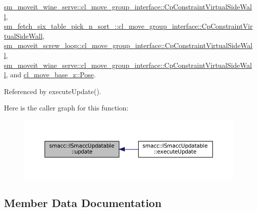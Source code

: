 \hyperlink{classsm__moveit__wine__serve_1_1cl__move__group__interface_1_1CpConstraintVirtualSideWall_a455681238d7baaaa5aa0f1e625864f3a}{sm\+\_\+moveit\+\_\+wine\+\_\+serve\+::cl\+\_\+move\+\_\+group\+\_\+interface\+::\+Cp\+Constraint\+Virtual\+Side\+Wall}, \hyperlink{classsm__fetch__six__table__pick__n__sort__1_1_1cl__move__group__interface_1_1CpConstraintVirtualSideWall_a7631ce0dba22a59484ad96eb0f5482d5}{sm\+\_\+fetch\+\_\+six\+\_\+table\+\_\+pick\+\_\+n\+\_\+sort\+\_\+::cl\+\_\+move\+\_\+group\+\_\+interface\+::\+Cp\+Constraint\+Virtual\+Side\+Wall}, \hyperlink{classsm__moveit__screw__loop_1_1cl__move__group__interface_1_1CpConstraintVirtualSideWall_a4582ad379597080236133d0f354f694e}{sm\+\_\+moveit\+\_\+screw\+\_\+loop\+::cl\+\_\+move\+\_\+group\+\_\+interface\+::\+Cp\+Constraint\+Virtual\+Side\+Wall}, \hyperlink{classsm__moveit__wine__serve_1_1cl__move__group__interface_1_1CpConstraintVirtualSideWall_a7cdb83affb53be16e9d2961aa8361e22}{sm\+\_\+moveit\+\_\+wine\+\_\+serve\+::cl\+\_\+move\+\_\+group\+\_\+interface\+::\+Cp\+Constraint\+Virtual\+Side\+Wall}, and \hyperlink{classcl__move__base__z_1_1Pose_abf99d1127cf51a93f97ada2031196114}{cl\+\_\+move\+\_\+base\+\_\+z\+::\+Pose}.



Referenced by execute\+Update().

Here is the caller graph for this function\+:
\nopagebreak
\begin{figure}[H]
\begin{center}
\leavevmode
\includegraphics[width=350pt]{classsmacc_1_1ISmaccUpdatable_a84ee0520cbefdb1d412bed54650b028e_icgraph}
\end{center}
\end{figure}


\subsection{Member Data Documentation}
\mbox{\label{classsmacc_1_1ISmaccUpdatable_ad58f7e1cd26d3fe8c3a3fccecc57feac}} 
